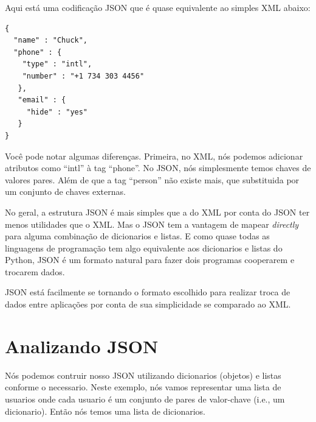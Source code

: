 Aqui está uma codificação JSON que é quase equivalente ao simples XML abaixo:

\beforeverb
\begin{verbatim}
{
  "name" : "Chuck",
  "phone" : {
    "type" : "intl",
    "number" : "+1 734 303 4456"
   },
   "email" : {
     "hide" : "yes"
   }
}
\end{verbatim}
\afterverb
%
Você pode notar algumas diferenças. Primeira, no XML, nós podemos adicionar
atributos como ``intl'' à tag ``phone''. No JSON, nós simplesmente temos chaves de
valores pares. Além de que a tag ``person'' não existe mais, que substituida por
um conjunto de chaves externas.

No geral, a estrutura JSON é mais simples que a do XML por conta do JSON ter menos
utilidades que o XML. Mas o JSON tem a vantagem de mapear {\em directly} para alguma
combinação de dicionarios e listas. E como quase todas as linguagens de programação 
tem algo equivalente aos dicionarios e listas do Python, JSON é um formato natural 
para fazer dois programas cooperarem e trocarem dados.

JSON está facilmente se tornando o formato escolhido para realizar troca de dados
entre aplicações por conta de sua simplicidade se comparado ao XML.

\section{Analizando JSON}

Nós podemos contruir nosso JSON utilizando dicionarios (objetos) e listas conforme
o necessario. Neste exemplo, nós vamos representar uma lista de usuarios onde cada
usuario é um conjunto de pares de valor-chave (i.e., um dicionario). Então nós temos
uma lista de dicionarios.

